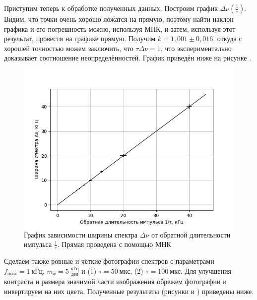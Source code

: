 \documentclass[a4paper,10pt]{article}
\begin{document}
Приступим теперь к обработке полученных данных. Построим график $\Delta\nu\left(\frac{1}{\tau}\right)$. Видим, что точки очень хорошо ложатся на прямую, поэтому найти наклон графика и его погрешность можно, используя МНК, и затем, используя этот результат, провести на графике прямую. Получим $k=1,001\pm0,016$, откуда с хорошей точностью можем заключить, что $\tau\Delta\nu=1$, что экспериментально доказывает соотношение неопределённостей. График приведён ниже на рисунке .

\begin{figure}[h]
	\centering
	\includegraphics[scale=0.75]{Plot_A}
	\caption{График зависимости ширины спектра $\Delta\nu$ от обратной длительности импульса $\frac{1}{\tau}$. Прямая проведена с помощью МНК} \label{Plot_A}
\end{figure}

Сделаем также ровные и чёткие фотографии спектров с параметрами $f_{повт}=1~\text{кГц}$, $m_x=5~\frac{\text{кГц}}{\text{дел}}$ и (1) $\tau=50~\text{мкс}$, (2) $\tau=100~\text{мкс}$. Для улучшения контраста и размера значимой части изображения обрежем фотографии и инвертируем на них цвета. Полученные результаты (рисунки  и ) приведены ниже.
\end{document}
